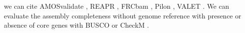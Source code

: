 \documentclass[main]{subfiles}
\begin{document}
we can cite AMOSvalidate \cite{amosvalidate}, REAPR \cite{REAPR}, FRCbam \cite{FRCbam}, Pilon \cite{Pilon}, VALET \cite{VALET}.
We can evaluate the assembly completeness without genome reference with presence or absence of core genes with BUSCO \cite{busco} or CheckM \cite{checkm}.


%

\end{document}
